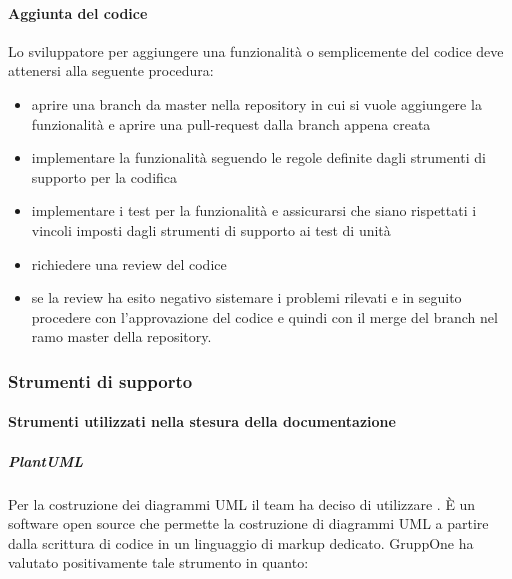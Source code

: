 \documentclass[../../norme-di-progetto.tex]{subfiles}
\begin{document}
\paragraph{Aggiunta del codice}%
\label{par:aggiunta_codice}
Lo sviluppatore per aggiungere una funzionalità o semplicemente del codice deve attenersi alla seguente procedura:
\begin{itemize}
  \item aprire una branch da master nella repository in cui si vuole aggiungere la funzionalità e aprire una pull-request dalla branch appena creata
  \item implementare la funzionalità seguendo le regole definite dagli strumenti di supporto per la codifica
  \item implementare i test per la funzionalità e assicurarsi che siano rispettati i vincoli imposti dagli strumenti di supporto ai test di unità
  \item richiedere una review del codice
  \item se la review ha esito negativo sistemare i problemi rilevati e in seguito procedere con l'approvazione del codice e quindi con il merge del branch nel ramo master della repository.
\end{itemize}





\subsubsection{Strumenti di supporto}%
\label{subs:strumenti_di_supporto}

\paragraph{Strumenti utilizzati nella stesura della documentazione}%
\label{par:strumenti_utilizzati_nella_stesura_della_documentazione}

\subparagraph{PlantUML}%
\label{subp:plantuml}
Per la costruzione dei diagrammi UML il team ha deciso di utilizzare \@.
È un software open source che permette la costruzione di diagrammi UML a partire dalla scrittura di codice in un linguaggio di markup dedicato. GruppOne ha valutato positivamente tale strumento in quanto:
\end{document}
